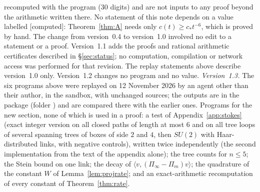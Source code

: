 \documentclass[11pt,a4paper]{article}
\theoremstyle{plain}
\theoremstyle{definition}
\theoremstyle{remark}
\numberwithin{equation}{section}
\newcommand{\st}[1]{\textsf{[#1]}}
\begin{document}
recomputed with the program  (30 digits) and are not inputs to any proof beyond the arithmetic written there.
No statement of this note depends on a value labelled \st{computed}: Theorem~\ref{thm:A} needs only $c(t)\ge c_*t^{-6}$, which is proved by hand.
The change from version~0.4 to version~1.0 involved no edit to a statement or a proof.
Version~1.1 adds the proofs and rational arithmetic certificates described in \S\ref{sec:status}; no computation, compilation or
network access was performed for that revision. The replay statements above describe version~1.0 only. Version~1.2 changes no program and no value.
\emph{Version~1.3.} The six programs above were replayed on 12 November 2026 by an agent other than their author, in the sandbox, with unchanged sources; the outputs are in the package (folder ) and are compared there with the earlier ones.
Programs for the new section, none of which is used in a proof: a test of Appendix~\ref{app:stokes} (exact integer version on all closed paths of length at most $6$ and on all tree loops of several spanning trees of boxes of side $2$ and $4$, then $SU(2)$ with Haar-distributed links, with negative controls),
written twice independently (the second implementation from the text of the appendix alone); the tree counts for $n\le5$; the Stein bound on one link; the decay of $\langle v,(\Pi_\infty-\Pi_m)v\rangle$; the quadrature of the constant $W$ of Lemma~\ref{lem:projrate}; and an exact-arithmetic recomputation of every constant of Theorem~\ref{thm:rate}.

\end{document}
